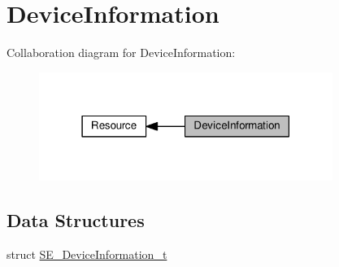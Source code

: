 \hypertarget{group__DeviceInformation}{}\section{Device\+Information}
\label{group__DeviceInformation}
Collaboration diagram for Device\+Information\+:\nopagebreak
\begin{figure}[H]
\begin{center}
\leavevmode
\includegraphics[width=271pt]{group__DeviceInformation}
\end{center}
\end{figure}
\subsection*{Data Structures}
\begin{DoxyCompactItemize}
\item 
struct \hyperlink{structSE__DeviceInformation__t}{S\+E\+\_\+\+Device\+Information\+\_\+t}
\end{DoxyCompactItemize}
